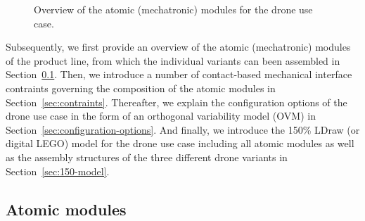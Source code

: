 \documentclass[sigconf,review]{acmart}
\begin{document}
\begin{figure}[tbp]
    
    \hfill
    \hfill
    \hfill

    \caption{Overview of the atomic (mechatronic) modules for the drone use case.}
    \label{fig:atomic-modules}
\end{figure}

Subsequently, we first provide an overview of the atomic (mechatronic) modules of the product line, from which the individual variants can been assembled in Section~\ref{sec:atomic-modules}.
Then, we introduce a number of contact-based mechanical interface contraints governing the composition of the atomic modules in Section~\ref{sec:contraints}.
Thereafter, we explain the configuration options of the drone use case in the form of an orthogonal variability model (OVM) in Section~\ref{sec:configuration-options}.
And finally, we introduce the 150\% LDraw (or digital LEGO) model for the drone use case including all atomic modules as well as the assembly structures of the three different drone variants in Section~\ref{sec:150-model}.

\subsection{Atomic modules}
\label{sec:atomic-modules}
\end{document}

